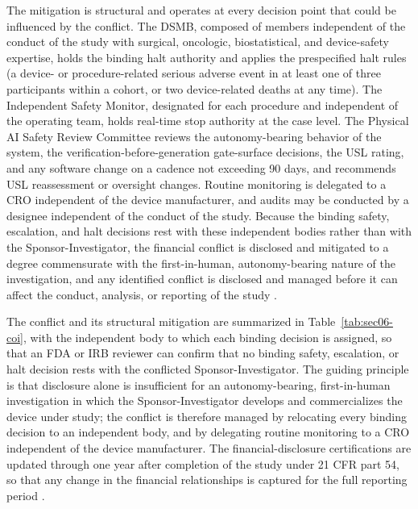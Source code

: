 The mitigation is structural and operates at every decision point that could be
influenced by the conflict. The DSMB, composed of members independent of the conduct
of the study with surgical, oncologic, biostatistical, and device-safety expertise,
holds the binding halt authority and applies the prespecified halt rules (a device-
or procedure-related serious adverse event in at least one of three participants
within a cohort, or two device-related deaths at any time). The Independent Safety
Monitor, designated for each procedure and independent of the operating team, holds
real-time stop authority at the case level. The Physical AI Safety Review Committee
reviews the autonomy-bearing behavior of the system, the verification-before-generation
gate-surface decisions, the USL rating, and any software change on a cadence not
exceeding 90 days, and recommends USL reassessment or oversight changes. Routine
monitoring is delegated to a CRO independent of the device manufacturer, and audits
may be conducted by a designee independent of the conduct of the study. Because the
binding safety, escalation, and halt decisions rest with these independent bodies
rather than with the Sponsor-Investigator, the financial conflict is disclosed and
mitigated to a degree commensurate with the first-in-human, autonomy-bearing nature
of the investigation, and any identified conflict is disclosed and managed before it
can affect the conduct, analysis, or reporting of the study \cite{daraxwhipple}.

The conflict and its structural mitigation are summarized in
Table~\ref{tab:sec06-coi}, with the independent body to which each binding decision
is assigned, so that an FDA or IRB reviewer can confirm that no binding safety,
escalation, or halt decision rests with the conflicted Sponsor-Investigator. The
guiding principle is that disclosure alone is insufficient for an autonomy-bearing,
first-in-human investigation in which the Sponsor-Investigator develops and
commercializes the device under study; the conflict is therefore managed by
relocating every binding decision to an independent body, and by delegating routine
monitoring to a CRO independent of the device manufacturer. The financial-disclosure
certifications are updated through one year after completion of the study under 21
CFR part 54, so that any change in the financial relationships is captured for the
full reporting period \cite{cfr312paiuni,paiautospons}.

